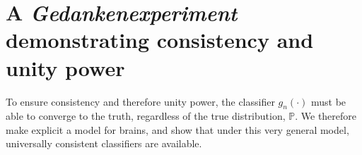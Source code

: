 \documentclass{article}
\newcommand{\PP}{\mathbb{P}}           %
\begin{document}


\section{A \emph{Gedankenexperiment} demonstrating consistency and unity power} %
\label{sub:uc}


To ensure consistency and therefore unity power, the classifier $g_n(\cdot)$ must be able to converge to the truth, regardless of the true distribution, $\PP$.  We therefore make explicit a model for brains, and show that under this very general model, universally consistent classifiers are available.
\end{document}

